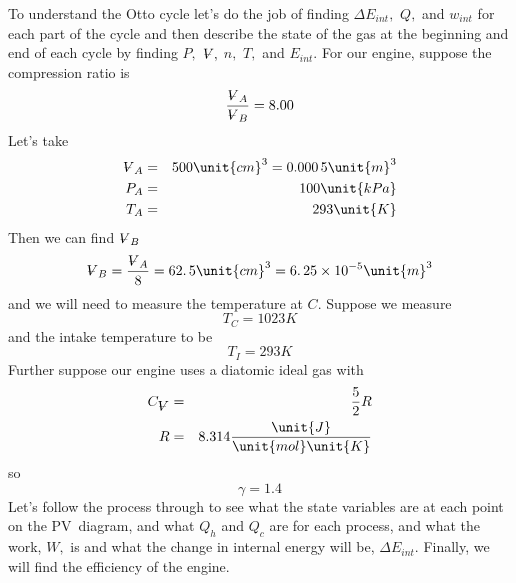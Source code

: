 \documentclass{article}
\begin{document}
To understand the Otto cycle let's do the job of finding $\Delta E_{int},$ $%
Q,$ and $w_{int}$ for each part of the cycle and then describe the state of
the gas at the beginning and end of each cycle by finding $P,$ $%
\ooalign{\hfil$V$\hfil\cr\kern0.1em--\hfil\cr}%
,$ $n,$ $T,$ and $E_{int}$. For our engine, suppose the compression ratio is 
\[
\frac{%
\ooalign{\hfil$V$\hfil\cr\kern0.1em--\hfil\cr}%
_{A}}{%
\ooalign{\hfil$V$\hfil\cr\kern0.1em--\hfil\cr}%
_{B}}=8.00 
\]%
Let's take 
\begin{eqnarray*}
\ooalign{\hfil$V$\hfil\cr\kern0.1em--\hfil\cr}%
_{A} &=&500\unit{cm}^{3}=\allowbreak 0.000\,5\unit{m}^{3} \\
P_{A} &=&100\unit{kPa} \\
T_{A} &=&293\unit{K}
\end{eqnarray*}%
Then we can find $%
\ooalign{\hfil$V$\hfil\cr\kern0.1em--\hfil\cr}%
_{B}$ 
\[
\ooalign{\hfil$V$\hfil\cr\kern0.1em--\hfil\cr}%
_{B}=\frac{%
\ooalign{\hfil$V$\hfil\cr\kern0.1em--\hfil\cr}%
_{A}}{8}=\allowbreak 62.\,\allowbreak 5\unit{cm}^{3}=\allowbreak
6.\,\allowbreak 25\times 10^{-5}\unit{m}^{3} 
\]%
and we will need to measure the temperature at $C.$ Suppose we measure 
\[
T_{C}=1023\unit{K} 
\]%
and the intake temperature to be 
\[
T_{I}=293\unit{K} 
\]%
Further suppose our engine uses a diatomic ideal gas with 
\begin{eqnarray*}
C_{%
\ooalign{\hfil$V$\hfil\cr\kern0.1em--\hfil\cr}%
} &=&\frac{5}{2}R \\
R &=&8.314\frac{\unit{J}}{\unit{mol}\unit{K}}
\end{eqnarray*}%
so 
\[
\gamma =1.4 
\]%
Let's follow the process through to see what the state variables are at each
point on the PV\ diagram, and what $Q_{h}$ and $Q_{c}$ are for each process,
and what the work, $W,$ is and what the change in internal energy will be, $%
\Delta E_{int}.$ Finally, we will find the efficiency of the engine.
\end{document}
